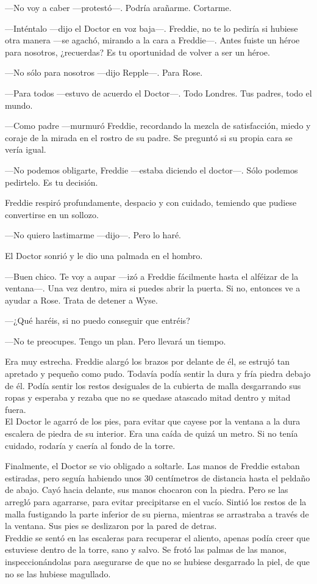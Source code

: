 {---No voy a caber ---protestó---. Podría arañarme. Cortarme.}

{---Inténtalo ---dijo el Doctor en voz baja---. Freddie, no te lo
	pediría si hubiese otra manera ---se agachó, mirando a la cara a
	Freddie---. Antes fuiste un héroe para nosotros, ¿recuerdas? Es
tu oportunidad de volver a ser un héroe.}

{---No sólo para nosotros ---dijo Repple---. Para Rose.}

{---Para todos ---estuvo de acuerdo el Doctor---. Todo
Londres. Tus padres, todo el mundo.}

{---Como padre ---murmuró Freddie, recordando la mezcla de satisfacción,
	miedo y coraje de la mirada en el rostro de su padre. Se preguntó si
su propia cara se vería igual.}

{---No podemos obligarte, Freddie ---estaba diciendo el
doctor---. Sólo podemos pedirtelo. Es tu decisión.}

{Freddie respiró profundamente, despacio y con cuidado, temiendo que
pudiese convertirse en un sollozo.}

{---No quiero lastimarme ---dijo---. Pero lo haré.}

{El Doctor sonrió y le dio una palmada en el hombro.}

{---Buen chico. Te voy a aupar ---izó a Freddie fácilmente hasta el
	alféizar de la ventana---. Una vez dentro, mira si puedes abrir la
	puerta. Si no, entonces ve a ayudar a Rose. Trata de detener a
Wyse.}

{---¿Qué haréis, si no puedo conseguir que entréis?}

{---No te preocupes. Tengo un plan. Pero llevará un tiempo.}

{Era muy estrecha. Freddie alargó los brazos por delante de él, se
	estrujó tan apretado y pequeño como pudo. Todavía podía sentir la
	dura y fría piedra debajo de él. Podía sentir los restos desiguales
	de la cubierta de malla desgarrando sus ropas y esperaba y rezaba que no
	se quedase atascado mitad dentro y mitad fuera.\\
	El Doctor le agarró de los pies, para evitar que cayese por la ventana a
	la dura escalera de piedra de su interior. Era una caída de quizá un
metro. Si no tenía cuidado, rodaría y caería al fondo de la torre.}

{Finalmente, el Doctor se vio obligado a soltarle. Las manos de
	Freddie estaban estiradas, pero seguía habiendo unos 30 centímetros de
	distancia hasta el peldaño de abajo. Cayó hacia delante, sus manos
	chocaron con la piedra. Pero se las arregló para agarrarse, para
	evitar precipitarse en el vacío. Sintió los restos de la malla
	fustigando la parte inferior de su pierna, mientras se arrastraba a
	través de la ventana. Sus pies se deslizaron por la pared de
	detras.\\
	Freddie se sentó en las escaleras para recuperar el aliento, apenas
	podía creer que estuviese dentro de la torre, sano y salvo. Se frotó
	las palmas de las manos, inspeccionándolas para asegurarse de que no se
hubiese desgarrado la piel, de que no se las hubiese magullado.}


